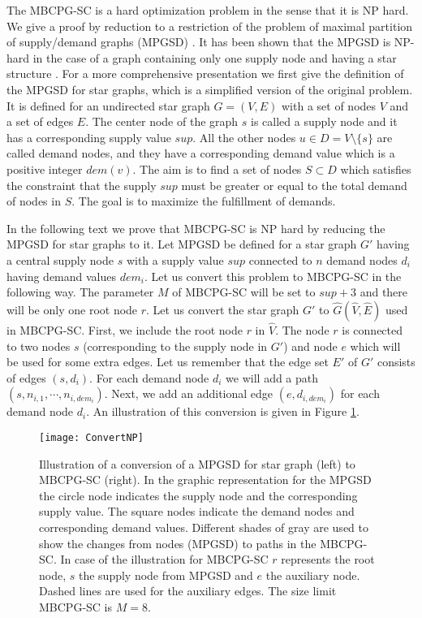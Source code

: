 The MBCPG-SC is a hard optimization problem in the sense that it is NP hard. We give a proof by reduction to a restriction of the problem of maximal partition of supply/demand graphs (MPGSD) \citep{Ito2008627}.  It has been shown that the MPGSD is NP-hard  in the case of a graph containing  only one supply node and having a star structure \citep{Ito2008627}.
For a more comprehensive presentation  we first give the definition of the MPGSD for star graphs, which is a simplified version of the original problem. It is defined for an undirected  star graph $G=(V,E)$  with a set of nodes $V$ and a set of edges $E$. The center node of the graph $s$ is called a supply node and it has a corresponding supply value $sup$. All the other nodes  $u\in D = V\setminus  \{s \}$ are  called demand nodes, and they have a corresponding  demand value  which is a positive integer  $dem(v)$.   The aim is to find a set of nodes  $S \subset D$ which satisfies the constraint that  the supply $sup$ must be greater or equal  to the total demand of nodes in $S$. The goal is to maximize the fulfillment of demands.



In the following text we prove that MBCPG-SC is NP hard by reducing the MPGSD for star graphs to it. Let MPGSD be defined  for a star graph $G'$ having a central supply node $s$ with a supply value $sup$ connected to $n$ demand nodes $d_i$ having demand values $dem_i$. Let us convert this problem to MBCPG-SC in the following way. The parameter  $M$ of MBCPG-SC will be set to $sup+3$ and there will be only one root node $r$. Let us convert the star graph $G'$ to  $\hat{G}(\hat{V}, \hat{E})$ used in MBCPG-SC. First, we include the root node $r$ in $\hat{V}$. The node $r$ is connected to two nodes $s$ (corresponding to the supply node in $G'$) and node $e$ which will be used for some extra edges.  Let us remember that the edge set $E'$ of $G'$ consists of edges $(s,d_i)$. For each demand node $d_i$ we will add a path $(s, n_{i,1}, \cdots , n_{i,dem_i})$. Next, we add an additional edge $(e,d_{i,dem_i})$  for each demand node $d_i$. An illustration of this conversion is given in Figure \ref{fig:ConvertNP}.
\begin{figure}[tcb]
\centering
\texttt{[image: ConvertNP]}
\caption{Illustration of a conversion of a MPGSD for star graph (left) to MBCPG-SC (right). In the graphic representation for the MPGSD the circle node indicates the supply node and the corresponding supply value. The square nodes indicate the demand nodes and corresponding demand values. Different shades of gray are used to show the changes from nodes (MPGSD) to paths in the MBCPG-SC. In case of the illustration for MBCPG-SC $r$ represents the root node, $s$ the supply node from MPGSD and $e$ the auxiliary node. Dashed lines are used for the auxiliary edges. The size limit MBCPG-SC is $M = 8$.}
\label{fig:ConvertNP}
\end{figure} 

